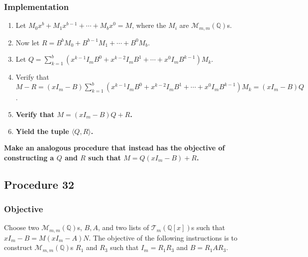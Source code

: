 \documentclass[twocolumn]{article}
\begin{document}
			\subsubsection{Implementation}
				\begin{enumerate}
					\item Let $M_0x^b+M_1x^{b-1}+\cdots+M_bx^0=M$, where the $M_i$ are $\mathcal{M}_{m,m}(\mathbb{Q})$s.
					\item Now let $R=B^bM_0+B^{b-1}M_1+\cdots+B^0M_b$.
					\item Let $Q=\sum_{k=1}^b (x^{k-1}I_mB^0+x^{k-2}I_mB^1+\cdots+x^0I_mB^{k-1})M_k$.
					\item Verify that $M-R=(xI_m-B)\sum_{k=1}^b (x^{k-1}I_mB^0+x^{k-2}I_mB^1+\cdots+x^0I_mB^{k-1})M_k=(xI_m-B)Q$.
					\item \textbf{Verify that $M=(xI_m-B)Q+R$.}
					\item \textbf{Yield the tuple $\langle Q,R\rangle$.}
				\end{enumerate}
			\textbf{Make an analogous procedure that instead has the objective of constructing a $Q$ and $R$ such that $M=Q(xI_m-B)+R$.}
		\subsection{Procedure 32}\label{sec:procedure 32}
			\subsubsection{Objective}
				Choose two $\mathcal{M}_{m,m}(\mathbb{Q})$s, $B,A$, and two lists of $\mathcal{T}_{m}(\mathbb{Q}[x])$s such that $xI_m-B=M(xI_m-A)N$. The objective of the following instructions is to construct $\mathcal{M}_{m,m}(\mathbb{Q})$s $R_1$ and $R_3$ such that $I_m=R_1R_3$ and $B=R_1AR_3$.
\end{document}
